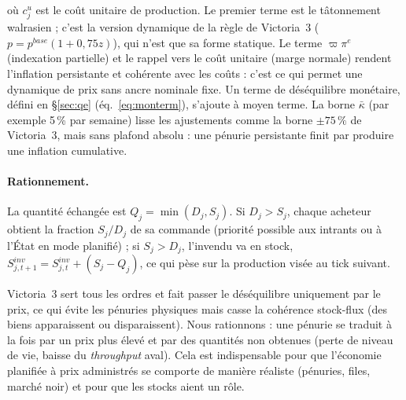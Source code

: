 \documentclass[11pt,a4paper]{article}
\begin{document}
où $c^u_j$ est le coût unitaire de production. Le premier terme est le tâtonnement walrasien ; c'est la version dynamique de la règle de Victoria~3 ($p = p^{base}(1+0{,}75 z)$), qui n'est que sa forme statique. Le terme $\varpi \pi^e$ (indexation partielle) et le rappel vers le coût unitaire (marge normale) rendent l'inflation persistante et cohérente avec les coûts : c'est ce qui permet une dynamique de prix sans ancre nominale fixe. Un terme de déséquilibre monétaire, défini en \S\ref{sec:qe} (éq.~\eqref{eq:monterm}), s'ajoute à moyen terme. La borne $\bar\kappa$ (par exemple 5\,\% par semaine) lisse les ajustements comme la borne $\pm75\,\%$ de Victoria~3, mais sans plafond absolu : une pénurie persistante finit par produire une inflation cumulative.

\paragraph{Rationnement.} La quantité échangée est $Q_j = \min(D_j, S_j)$. Si $D_j > S_j$, chaque acheteur obtient la fraction $S_j/D_j$ de sa commande (priorité possible aux intrants ou à l'État en mode planifié) ; si $S_j > D_j$, l'invendu va en stock, $S^{inv}_{j,t+1} = S^{inv}_{j,t} + (S_j - Q_j)$, ce qui pèse sur la production visée au tick suivant.

\begin{design}
Victoria~3 sert tous les ordres et fait passer le déséquilibre uniquement par le prix, ce qui évite les pénuries physiques mais casse la cohérence stock-flux (des biens apparaissent ou disparaissent). Nous rationnons : une pénurie se traduit à la fois par un prix plus élevé et par des quantités non obtenues (perte de niveau de vie, baisse du \emph{throughput} aval). Cela est indispensable pour que l'économie planifiée à prix administrés se comporte de manière réaliste (pénuries, files, marché noir) et pour que les stocks aient un rôle.
\end{design}
\end{document}
